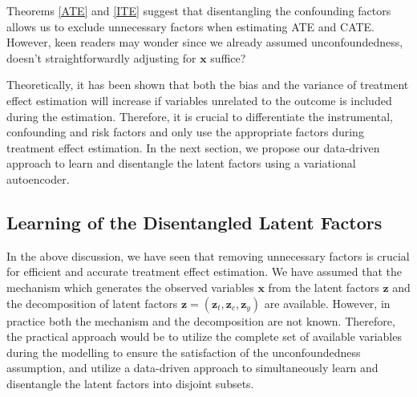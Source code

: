 \documentclass[letterpaper]{article} %
\newtheorem{theorem}{Theorem}
\begin{document}
Theorems \ref{ATE} and \ref{ITE} suggest that disentangling the confounding factors allows us to exclude unnecessary factors when estimating ATE and CATE. However, keen readers may wonder since we already assumed unconfoundedness, doesn't straightforwardly adjusting for $\mathbf{x}$ suffice?

Theoretically, it has been shown that both the bias \cite{Abadie2006} and the variance \cite{Hahn1998} of treatment effect estimation will increase if variables unrelated to the outcome is included during the estimation. Therefore, it is crucial to differentiate the instrumental, confounding and risk factors and only use the appropriate factors during treatment effect estimation.
In the next section, we propose our data-driven approach to learn and disentangle the latent factors using a variational autoencoder.


\subsection*{Learning of the Disentangled Latent Factors}


In the above discussion, we have seen that removing unnecessary factors is crucial for efficient and accurate treatment effect estimation. We have assumed that the mechanism which generates the observed variables $\mathbf{x}$ from the latent factors $\mathbf{z}$ and the decomposition of latent factors $\mathbf{z} = (\mathbf{z}_t, \mathbf{z}_c, \mathbf{z}_y)$ are available.
However, in practice both the mechanism and the decomposition are not known. Therefore, the practical approach would be to utilize the complete set of available variables during the modelling to ensure the satisfaction of the unconfoundedness assumption, and utilize a data-driven approach to simultaneously learn and disentangle the latent factors into disjoint subsets.
\end{document}
